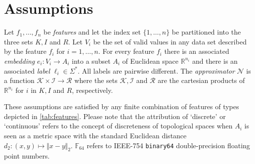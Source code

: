 \documentclass[a4paper,parskip=half]{scrartcl}
\author{Franz Brauße}
\begin{document}
\section{Assumptions}
Let $f_1,\ldots,f_n$ be \emph{features} and let
the index set $\{1,\ldots,n\}$ be partitioned into the three sets $K,I$ and $R$.
Let $V_i%
$ be the set of valid values
in any data set described by the feature $f_i$ for $i=1,\ldots,n$.
For every feature $f_i$ there is an associated \emph{embedding} $e_i:V_i\to A_i$
into a subset $A_i$ of Euclidean space $\mathbb R^{n_i}$ and
there is an associated \emph{label} $\ell_i\in\Sigma^*$.
All labels are pairwise different.
The \emph{approximator} $\mathcal N$ is a function
$\mathcal K\times\mathcal I\to\mathcal R$ where
the sets $\mathcal K,\mathcal I$ and $\mathcal R$ are the cartesian products of
$\mathbb R^{n_i}$ for $i$ in $K,I$ and $R$, respectively.

These assumptions are satisfied by any finite combination of features of types
depicted in \cref{tab:features}.
Please note that the attribution of `discrete' or `continuous' refers to the
concept of discreteness of topological spaces when $A_i$ is seen as a metric
space with the standard Euclidean distance $d_2:(x,y)\mapsto\Vert x-y\Vert_2$.
$\mathbb F_{64}$ refers to IEEE-754 \texttt{binary64} double-precision
floating point numbers.
\end{document}
